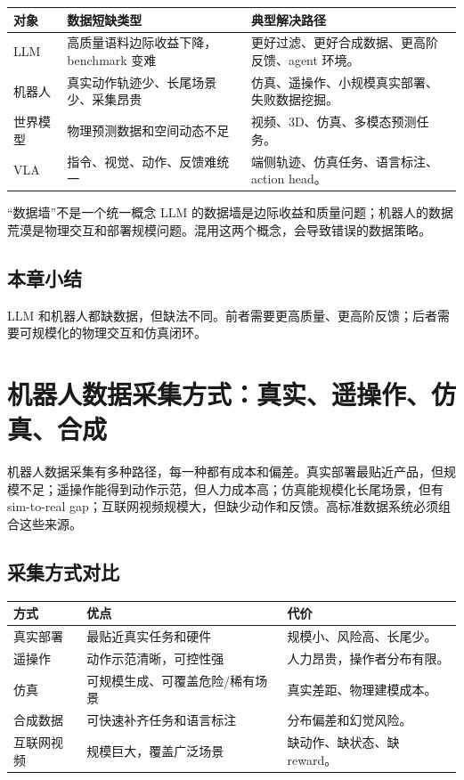 \documentclass[a4paper]{article}
\begin{document}
\noindent\begin{longtable}{p{}p{}p{}}
\toprule
对象 & 数据短缺类型 & 典型解决路径 \\
\midrule
LLM & 高质量语料边际收益下降，benchmark 变难 & 更好过滤、更好合成数据、更高阶反馈、agent 环境。 \\
机器人 & 真实动作轨迹少、长尾场景少、采集昂贵 & 仿真、遥操作、小规模真实部署、失败数据挖掘。 \\
世界模型 & 物理预测数据和空间动态不足 & 视频、3D、仿真、多模态预测任务。 \\
VLA & 指令、视觉、动作、反馈难统一 & 端侧轨迹、仿真任务、语言标注、action head。 \\
\bottomrule
\end{longtable}

\begin{importantbox}{“数据墙”不是一个统一概念}
LLM 的数据墙是边际收益和质量问题；机器人的数据荒漠是物理交互和部署规模问题。混用这两个概念，会导致错误的数据策略。
\end{importantbox}

\subsection{本章小结}

LLM 和机器人都缺数据，但缺法不同。前者需要更高质量、更高阶反馈；后者需要可规模化的物理交互和仿真闭环。

\section{机器人数据采集方式：真实、遥操作、仿真、合成}

机器人数据采集有多种路径，每一种都有成本和偏差。真实部署最贴近产品，但规模不足；遥操作能得到动作示范，但人力成本高；仿真能规模化长尾场景，但有 sim-to-real gap；互联网视频规模大，但缺少动作和反馈。高标准数据系统必须组合这些来源。

\subsection{采集方式对比}

\noindent\begin{longtable}{p{}p{}p{}}
\toprule
方式 & 优点 & 代价 \\
\midrule
真实部署 & 最贴近真实任务和硬件 & 规模小、风险高、长尾少。 \\
遥操作 & 动作示范清晰，可控性强 & 人力昂贵，操作者分布有限。 \\
仿真 & 可规模生成、可覆盖危险/稀有场景 & 真实差距、物理建模成本。 \\
合成数据 & 可快速补齐任务和语言标注 & 分布偏差和幻觉风险。 \\
互联网视频 & 规模巨大，覆盖广泛场景 & 缺动作、缺状态、缺 reward。 \\
\bottomrule
\end{longtable}
\end{document}
